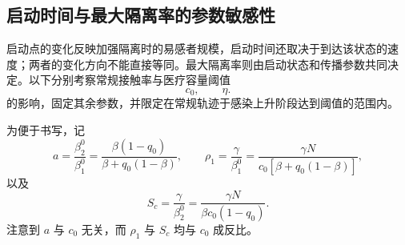 \documentclass[UTF8,a4paper,10pt,fontset=fandol]{ctexart}
\theoremstyle{cnplain}
\theoremstyle{remark}
\numberwithin{equation}{section}
\begin{document}
\subsection{启动时间与最大隔离率的参数敏感性}
启动点的变化反映加强隔离时的易感者规模，启动时间还取决于到达该状态的速度；两者的变化方向不能直接等同。最大隔离率则由启动状态和传播参数共同决定。以下分别考察常规接触率与医疗容量阈值
\[
c_0,\qquad \eta .
\]
的影响，固定其余参数，并限定在常规轨迹于感染上升阶段达到阈值的范围内。

为便于书写，记
\begin{equation}
a=\frac{\beta_2^0}{\beta_1^0}
=
\frac{\beta(1-q_0)}{\beta+q_0(1-\beta)},
\qquad
\rho_1=\frac{\gamma}{\beta_1^0}
=
\frac{\gamma N}{c_0[\beta+q_0(1-\beta)]},
\end{equation}
以及
\begin{equation}
S_c=\frac{\gamma}{\beta_2^0}
=
\frac{\gamma N}{\beta c_0(1-q_0)}.
\end{equation}
注意到 $a$ 与 $c_0$ 无关，而 $\rho_1$ 与 $S_c$ 均与 $c_0$ 成反比。
\end{document}
